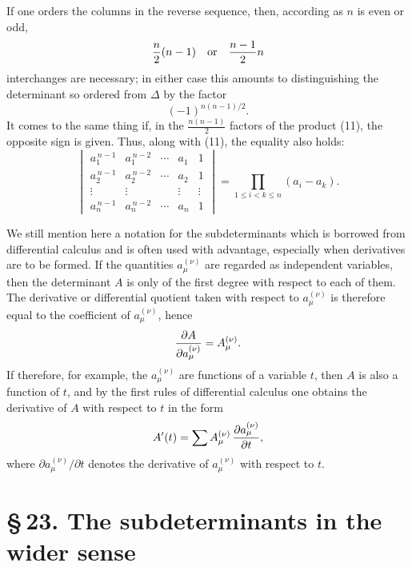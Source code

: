 \documentclass[11pt]{article}
\begin{document}
If one orders the columns in the reverse sequence, then, according as \(n\) is even or odd,
\[
 {n\over2}(n-1)\quad\hbox{or}\quad {n-1\over2}n
\]
interchanges are necessary; in either case this amounts to distinguishing the determinant so ordered from \(\Delta\) by the factor
\[
 (-1)^{n(n-1)/2}.
\]
It comes to the same thing if, in the \(\frac{n(n-1)}{2}\) factors of the product (11), the opposite sign is given. Thus, along with (11), the equality also holds:
\begin{equation}
\begin{vmatrix}
a_1^{\,n-1}&a_1^{\,n-2}&\cdots&a_1&1\\
a_2^{\,n-1}&a_2^{\,n-2}&\cdots&a_2&1\\
\vdots&\vdots&&\vdots&\vdots\\
a_n^{\,n-1}&a_n^{\,n-2}&\cdots&a_n&1
\end{vmatrix}
=
\prod_{1\le i<k\le n}(a_i-a_k).
\tag{12}
\end{equation}

We still mention here a notation for the subdeterminants which is borrowed from differential calculus and is often used with advantage, especially when derivatives are to be formed. If the quantities \(a_\mu^{(\nu)}\) are regarded as independent variables, then the determinant \(A\) is only of the first degree with respect to each of them. The derivative or differential quotient taken with respect to \(a_\mu^{(\nu)}\) is therefore equal to the coefficient of \(a_\mu^{(\nu)}\), hence
\[
 {\partial A\over\partial a_\mu^{(\nu)}}=A_\mu^{(\nu)}.
\]
If therefore, for example, the \(a_\mu^{(\nu)}\) are functions of a variable \(t\), then \(A\) is also a function of \(t\), and by the first rules of differential calculus one obtains the derivative of \(A\) with respect to \(t\) in the form
\[
 A'(t)=\sum A_\mu^{(\nu)}\,{\partial a_\mu^{(\nu)}\over\partial t},
\]
where \(\partial a_\mu^{(\nu)}/\partial t\) denotes the derivative of \(a_\mu^{(\nu)}\) with respect to \(t\).


\section*{\S\,23. The subdeterminants in the wider sense}
\end{document}
